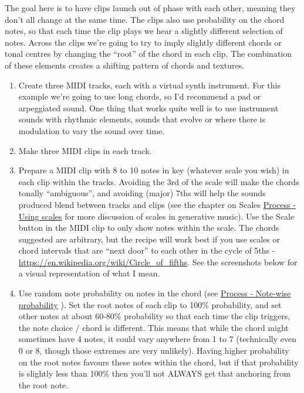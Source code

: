\documentclass[
  12pt,
  letterpaper,
  oneside,
  open=any]{scrbook}
\begin{document}
\begin{tcolorbox}[enhanced jigsaw, breakable, left=2mm, leftrule=.75mm, toprule=.15mm, opacitybacktitle=0.6, toptitle=1mm, coltitle=black, colback=white, colbacktitle=quarto-callout-tip-color!10!white, opacityback=0, rightrule=.15mm, bottomrule=.15mm, titlerule=0mm, title=\textcolor{quarto-callout-tip-color}{\faLightbulb}\hspace{0.5em}{Key idea}, arc=.35mm, bottomtitle=1mm, colframe=quarto-callout-tip-color-frame]

The goal here is to have clips launch out of phase with each other,
meaning they don't all change at the same time. The clips also use
probability on the chord notes, so that each time the clip plays we hear
a slightly different selection of notes. Across the clips we're going to
try to imply slightly different chords or tonal centres by changing the
``root'' of the chord in each clip. The combination of these elements
creates a shifting pattern of chords and textures.

\end{tcolorbox}

\begin{enumerate}
\def\labelenumi{\arabic{enumi}.}
\item
  Create three MIDI tracks, each with a virtual synth instrument. For
  this example we're going to use long chords, so I'd recommend a pad or
  arpeggiated sound. One thing that works quite well is to use
  instrument sounds with rhythmic elements, sounds that evolve or where
  there is modulation to vary the sound over time.
\item
  Make three MIDI clips in each track.
\item
  Prepare a MIDI clip with 8 to 10 notes in key (whatever scale you
  wish) in each clip within the tracks. Avoiding the 3rd of the scale
  will make the chords tonally ``ambiguous'', and avoiding (major) 7ths
  will help the sounds produced blend between tracks and clips (see the
  chapter on Scales \hyperref[Chapter-018-Process-Scales]{Process -
  Using scales} for more discussion of scales in generative music). Use
  the Scale button in the MIDI clip to only show notes within the scale.
  The chords suggested are arbitrary, but the recipe will work best if
  you use scales or chord intervals that are ``next door'' to each other
  in the cycle of 5ths -
  \url{https://en.wikipedia.org/wiki/Circle_of_fifths}. See the
  screenshots below for a visual representation of what I mean.
\item
  Use random note probability on notes in the chord (see
  \hyperref[Chapter-002-Process-Note_wise_probability]{Process -
  Note-wise probability} ). Set the root notes of each clip to 100\%
  probability, and set other notes at about 60-80\% probability so that
  each time the clip triggers, the note choice / chord is different.
  This means that while the chord might sometimes have 4 notes, it could
  vary anywhere from 1 to 7 (technically even 0 or 8, though those
  extremes are very unlikely). Having higher probability on the root
  notes favours these notes within the chord, but if that probability is
  slightly less than 100\% then you'll not ALWAYS get that anchoring
  from the root note.
\end{enumerate}
\end{document}
